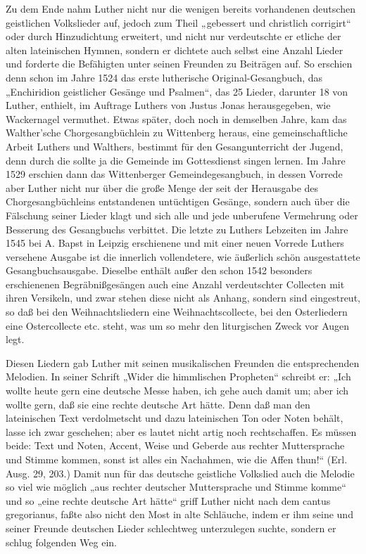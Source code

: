 Zu dem Ende nahm Luther nicht nur die wenigen bereits vorhandenen deutschen geistlichen Volkslieder auf, jedoch zum Theil „gebessert und christlich corrigirt“ oder durch Hinzudichtung erweitert, und nicht nur verdeutschte er etliche der alten lateinischen Hymnen, sondern er dichtete auch selbst eine Anzahl Lieder und forderte die Befähigten unter seinen Freunden zu Beiträgen auf. So erschien denn schon im Jahre 1524 das erste lutherische Original-Gesangbuch, das „Enchiridion geistlicher Gesänge und Psalmen“, das 25 Lieder, darunter 18 von Luther, enthielt, im Auftrage Luthers von Justus Jonas herausgegeben, wie Wackernagel vermuthet. Etwas später, doch noch in demselben Jahre, kam das Walther’sche Chorgesangbüchlein zu Wittenberg heraus, eine gemeinschaftliche Arbeit Luthers und Walthers, bestimmt für den Gesangunterricht der Jugend, denn durch die sollte ja die Gemeinde im Gottesdienst singen lernen. Im Jahre 1529 erschien dann das Wittenberger Gemeindegesangbuch, in dessen Vorrede aber Luther nicht nur über die große Menge der seit der Herausgabe des Chorgesangbüchleins entstandenen untüchtigen Gesänge, sondern auch über die Fälschung seiner Lieder klagt und sich alle und jede unberufene Vermehrung oder Besserung des Gesangbuchs verbittet. Die letzte zu Luthers Lebzeiten im Jahre 1545 bei A. Bapst in Leipzig erschienene und mit einer neuen Vorrede Luthers versehene Ausgabe ist die innerlich vollendetere, wie äußerlich schön ausgestattete Gesangbuchsausgabe. Dieselbe enthält außer den schon 1542 besonders erschienenen Begräbnißgesängen auch eine Anzahl verdeutschter Collecten mit ihren Versikeln, und zwar stehen diese nicht als Anhang, sondern sind eingestreut, so daß bei den Weihnachtsliedern eine Weihnachtscollecte, bei den Osterliedern eine Ostercollecte etc. steht, was um so mehr den liturgischen Zweck vor Augen legt.

Diesen Liedern gab Luther mit seinen musikalischen Freunden die entsprechenden Melodien. In seiner Schrift „Wider die himmlischen Propheten“ schreibt er: „Ich wollte heute gern eine deutsche Messe haben, ich gehe auch damit um; aber ich wollte gern, daß sie eine rechte deutsche Art hätte. Denn daß man den lateinischen Text verdolmetscht und dazu lateinischen Ton oder Noten behält, lasse ich zwar geschehen; aber es lautet nicht
artig noch rechtschaffen. Es müssen beide: Text und Noten, Accent, Weise und Geberde aus rechter Muttersprache und Stimme kommen, sonst ist alles ein Nachahmen, wie die Affen thun!“ (Erl. Ausg. 29, 203.) Damit nun für das deutsche geistliche Volkslied auch die Melodie so viel wie möglich „aus rechter deutscher Muttersprache und Stimme komme“ und so „eine rechte deutsche Art hätte“ griff Luther nicht nach dem cantus gregorianus, faßte also nicht den Most in alte Schläuche, indem er ihm seine und seiner Freunde deutschen Lieder schlechtweg unterzulegen suchte, sondern er schlug folgenden Weg ein.

